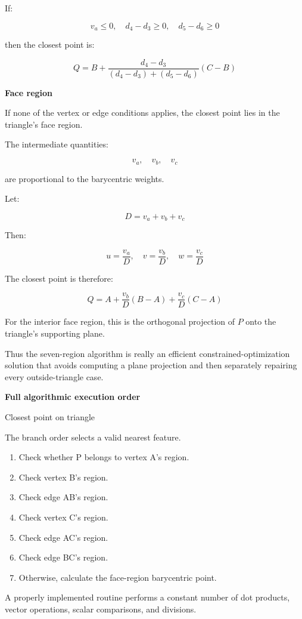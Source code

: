 If:

\[
v_a\le0,\quad d_4-d_3\ge0,\quad d_5-d_6\ge0
\]

then the closest point is:

\[
\boxed{ Q=B+ \frac{d_4-d_3} {(d_4-d_3)+(d_5-d_6)} (C-B) }
\]

\textbf{Face region}

If none of the vertex or edge conditions applies, the closest point lies in the triangle's face region.

The intermediate quantities:

\[
v_a,\quad v_b,\quad v_c
\]

are proportional to the barycentric weights.

Let:

\[
D=v_a+v_b+v_c
\]

Then:

\[
u=\frac{v_a}{D},\quad v=\frac{v_b}{D},\quad w=\frac{v_c}{D}
\]

The closest point is therefore:

\[
\boxed{ Q=A+\frac{v_b}{D}(B-A)+\frac{v_c}{D}(C-A) }
\]

For the interior face region, this is the orthogonal projection of \(P\) onto the triangle's supporting plane.

Thus the seven-region algorithm is really an efficient constrained-optimization solution that avoids computing a plane projection and then separately repairing every outside-triangle case.

\textbf{Full algorithmic execution order}

Closest point on triangle

The branch order selects a valid nearest feature.

\begin{enumerate}
\def\labelenumi{\arabic{enumi}.}
\tightlist
\item
  Check whether P belongs to vertex A's region.
\item
  Check vertex B's region.
\item
  Check edge AB's region.
\item
  Check vertex C's region.
\item
  Check edge AC's region.
\item
  Check edge BC's region.
\item
  Otherwise, calculate the face-region barycentric point.
\end{enumerate}

A properly implemented routine performs a constant number of dot products, vector operations, scalar comparisons, and divisions.

